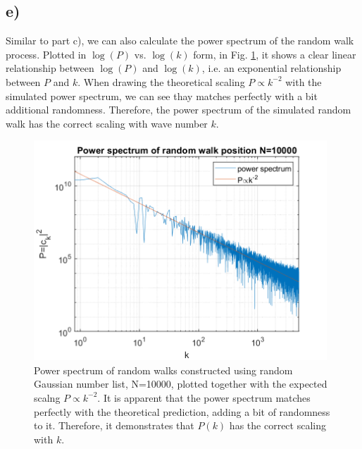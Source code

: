 \documentclass[12pt, graphicx]{article}
\begin{document}
\subsection*{e)}
Similar to part c), we can also calculate the power spectrum of the random walk process. Plotted in $\log(P)$ vs. $\log(k)$ form, in Fig. \ref{fig:psrw}, it shows a clear linear relationship between $\log(P)$ and $\log(k)$, i.e. an exponential relationship between $P$ and $k$. When drawing the theoretical scaling $P\propto k^{-2}$ with the simulated power spectrum, we can see thay matches perfectly with a bit additional randomness. Therefore, the power spectrum of the simulated random walk has the correct scaling with wave number $k$.

\begin{figure}[ht]
\centering
\includegraphics[width = 110mm]{psrw.png}
\caption{Power spectrum of random walks constructed using random Gaussian number list, N=10000, plotted together with the expected scalng $P\propto k^{-2}$. It is apparent that the power spectrum matches perfectly with the theoretical prediction, adding a bit of randomness to it. Therefore, it demonstrates that $P(k)$ has the correct scaling with $k$.}
\label{fig:psrw}
\end{figure}
\end{document}
